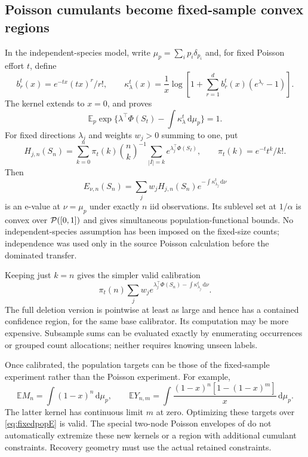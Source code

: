\documentclass[11pt]{article}
\numberwithin{equation}{section}
\theoremstyle{definition}
\theoremstyle{remark}
\newcommand{\E}{\mathbb E}\newcommand{\Pp}{\mathbb P}\newcommand{\R}{\mathbb R}\newcommand{\N}{\mathbb N}
\newcommand{\dd}{\,\mathrm d}\newcommand{\norm}[1]{\left\lVert#1\right\rVert}\newcommand{\Scal}{\mathsf S}\newcommand{\Tcal}{\mathsf T}
\begin{document}
\subsection{Poisson cumulants become fixed-sample convex regions}\label{subsec:fixedpop}
In the independent-species model, write $\mu_p=\sum_ip_i\delta_{p_i}$ and, for fixed Poisson effort $t$, define
\[
 b_r^t(x)=e^{-tx}(tx)^r/r!,\qquad
 \kappa^t_\lambda(x)=\frac1x\log\left[1+\sum_{r=1}^db_r^t(x)(e^{\lambda_r}-1)\right].
\]
The kernel extends to $x=0$, and \cite[Theorem 7.1]{LongI} proves
\[
 \E_p\exp\{\lambda^\top\Phi(S_t)-\textstyle\int\kappa^t_\lambda\dd\mu_p\}=1.
\]
For fixed directions $\lambda_j$ and weights $w_j>0$ summing to one, put
\begin{equation}\label{eq:Hpop}
 H_{j,n}(S_n)=\sum_{k=0}^n\pi_t(k)\binom nk^{-1}
                 \sum_{|I|=k}e^{\lambda_j^\top\Phi(S_I)},
 \qquad \pi_t(k)=e^{-t}t^k/k!.
\end{equation}
Then
\begin{equation}\label{eq:fixedpopE}
 E_{\nu,n}(S_n)=\sum_jw_jH_{j,n}(S_n)
                         e^{-\int\kappa^t_{\lambda_j}\dd\nu}
\end{equation}
is an e-value at $\nu=\mu_p$ under exactly $n$ iid observations. Its sublevel set at $1/\alpha$ is convex over $\mathcal P([0,1])$ and gives simultaneous population-functional bounds. No independent-species assumption has been imposed on the fixed-size counts; independence was used only in the source Poisson calculation before the dominated transfer.

Keeping just $k=n$ gives the simpler valid calibration
\[
 \pi_t(n)\sum_jw_j e^{\lambda_j^\top\Phi(S_n)-\int\kappa^t_{\lambda_j}\dd\nu}.
\]
The full deletion version is pointwise at least as large and hence has a contained confidence region, for the same base calibrator. Its computation may be more expensive. Subsample sums can be evaluated exactly by enumerating occurrences or grouped count allocations; neither requires knowing unseen labels.

Once calibrated, the population targets can be those of the fixed-sample experiment rather than the Poisson experiment. For example,
\begin{equation}\label{eq:fixedtargets}
 \E M_n=\int(1-x)^n\dd\mu_p,
 \qquad \E Y_{n,m}=\int\frac{(1-x)^n[1-(1-x)^m]}x\dd\mu_p.
\end{equation}
The latter kernel has continuous limit $m$ at zero. Optimizing these targets over \eqref{eq:fixedpopE} is valid. The special two-node Poisson envelopes of \cite[Theorem 5.3]{LongI} do not automatically extremize these new kernels or a region with additional cumulant constraints. Recovery geometry must use the actual retained constraints.
\end{document}
